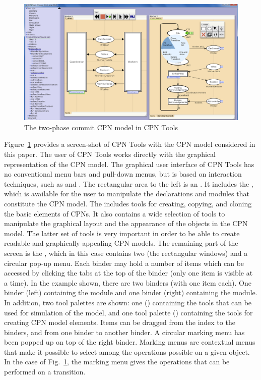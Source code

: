 \begin{figure}[t]
\centering
\includegraphics[scale=.37]{figures/cpntools.png}
\caption{The two-phase commit CPN model in CPN Tools}
\label{fig:cpntools}
\end{figure}

Figure~\ref{fig:cpntools} provides a screen-shot of CPN Tools with the
CPN model considered in this paper. The user of CPN Tools works
directly with the graphical representation of the CPN model. The
graphical user interface of CPN Tools has no conventional menu bars
and pull-down menus, but is based on interaction techniques, such as
 and . The rectangular
area to the left is an . It includes the , which is available for the user to manipulate the declarations
and modules that constitute the CPN model. The 
includes tools for creating, copying, and cloning the basic elements
of CPNs. It also contains a wide selection of tools to manipulate the
graphical layout and the appearance of the objects in the CPN
model. The latter set of tools is very important in order to be able
to create readable and graphically appealing CPN models. The remaining
part of the screen is the , which in this case
contains two  (the rectangular windows) and a
circular pop-up menu. Each binder may hold a number of items which can
be accessed by clicking the tabs at the top of the binder (only one
item is visible at a time). In the example shown, there are two
binders (with one item each). One binder (left) containing the
 module and one binder (right) containing the
 module. In addition, two tool palettes are
shown: one () containing the tools that can be used for
simulation of the model, and one tool palette ()
containing the tools for creating CPN model elements. Items can be
dragged from the index to the binders, and from one binder to another
binder. A circular marking menu has been popped up on top of the right
binder. Marking menus are contextual menus that make it possible to
select among the operations possible on a given object. In the case of
Fig.~\ref{fig:cpntools}, the marking menu gives the operations that
can be performed on a transition.




